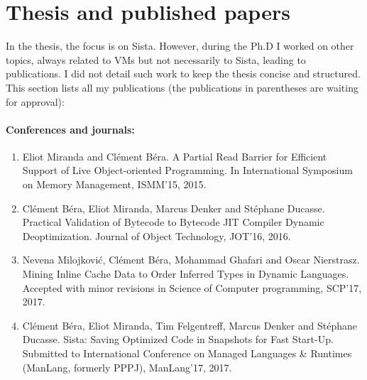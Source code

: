 \documentclass[a4paper,12pt,twoside]{../includes/ThesisStyle}
\begin{document}
\section{Thesis and published papers}

In the thesis, the focus is on Sista. However, during the Ph.D I worked on other topics, always related to VMs but not necessarily to Sista, leading to publications. I did not detail such work to keep the thesis concise and structured. This section lists all my publications (the publications in parentheses are waiting for approval):

\paragraph{Conferences and journals:}
\begin{enumerate}
	\item Eliot Miranda and Cl\'ement B\'era. A Partial Read Barrier for Efficient Support of Live Object-oriented Programming. In International Symposium on Memory Management, ISMM'15, 2015.
	\item Cl\'ement B\'era, Eliot Miranda, Marcus Denker and St\'ephane Ducasse. Practical Validation of Bytecode to Bytecode JIT Compiler Dynamic Deoptimization. Journal of Object Technology, JOT'16, 2016.
\end{enumerate}	
\begin{enumerate}[label=(\arabic*)]
	\setcounter{enumi}{2}
	\item Nevena Milojkovi\'c, Cl\'ement B\'era, Mohammad Ghafari and Oscar Nierstrasz. Mining Inline Cache Data to Order Inferred Types in Dynamic Languages. Accepted with minor revisions in Science of Computer programming, SCP'17, 2017.
	\item Cl\'ement B\'era, Eliot Miranda, Tim Felgentreff, Marcus Denker and St\'ephane Ducasse. Sista: Saving Optimized Code in Snapshots for Fast Start-Up. Submitted to International Conference on Managed Languages \& Runtimes (ManLang, formerly PPPJ), ManLang'17, 2017.
\end{enumerate}	
\end{document}
